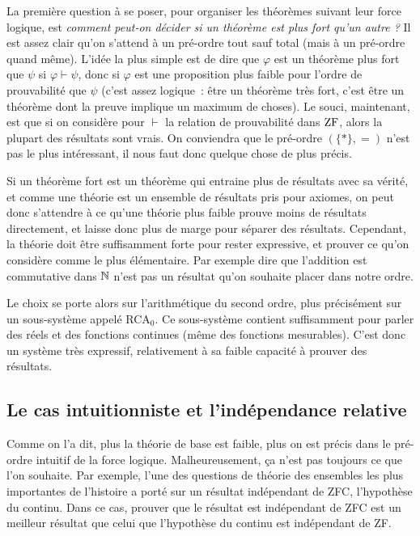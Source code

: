 \documentclass{article}
\begin{document}
La première question à se poser, pour organiser les théorèmes suivant leur force logique, est \textit{comment peut-on décider si un théorème est plus fort qu'un autre ?} Il est assez clair qu'on s'attend à un pré-ordre tout sauf total (mais à un pré-ordre quand même). L'idée la plus simple est de dire que $\varphi$ est un théorème plus fort que $\psi$ si $\varphi \vdash \psi$, donc si $\varphi$ est une proposition plus faible pour l'ordre de prouvabilité que $\psi$ (c'est assez logique~: être un théorème très fort, c'est être un théorème dont la preuve implique un maximum de choses). Le souci, maintenant, est que si on considère pour $\vdash$ la relation de prouvabilité dans $\mathrm{ZF}$, alors la plupart des résultats sont vrais. On conviendra que le pré-ordre $(\{*\},=)$ n'est pas le plus intéressant, il nous faut donc quelque chose de plus précis.

Si un théorème fort est un théorème qui entraine plus de résultats avec sa vérité, et comme une théorie est un ensemble de résultats pris pour axiomes, on peut donc s'attendre à ce qu'une théorie plus faible prouve moins de résultats directement, et laisse donc plus de marge pour séparer des résultats. Cependant, la théorie doit être suffisamment forte pour rester expressive, et prouver ce qu'on considère comme le plus élémentaire. Par exemple dire que l'addition est commutative dans $\mathbb{N}$ n'est pas un résultat qu'on souhaite placer dans notre ordre.

Le choix se porte alors sur l'arithmétique du second ordre, plus précisément sur un sous-système appelé RCA$_0$. Ce sous-système contient suffisamment pour parler des réels et des fonctions continues (même des fonctions mesurables). C'est donc un système très expressif, relativement à sa faible capacité à prouver des résultats.

\subsection{Le cas intuitionniste et l'indépendance relative}

Comme on l'a dit, plus la théorie de base est faible, plus on est précis dans le pré-ordre intuitif de la force logique. Malheureusement, ça n'est pas toujours ce que l'on souhaite. Par exemple, l'une des questions de théorie des ensembles les plus importantes de l'histoire a porté sur un résultat indépendant de ZFC, l'hypothèse du continu. Dans ce cas, prouver que le résultat est indépendant de ZFC est un meilleur résultat que celui que l'hypothèse du continu est indépendant de ZF.
\end{document}
